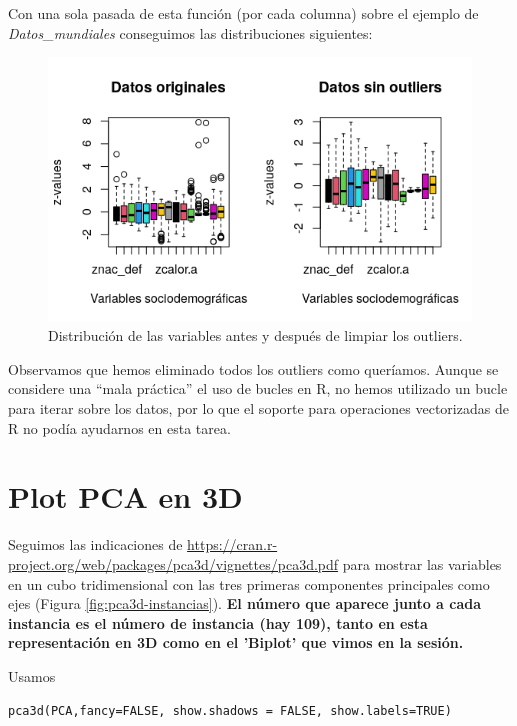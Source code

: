 \documentclass[12pt]{article}
\begin{document}
Con una sola pasada de esta función (por cada columna) sobre el
ejemplo de \textit{Datos\_mundiales} conseguimos las distribuciones siguientes:

\begin{figure}[H]
  \centering
  \includegraphics[width=140mm]{imgs/mundiales-outliers}
  \caption{Distribución de las variables antes y después de limpiar los outliers.}
\end{figure}

Observamos que hemos eliminado todos los outliers como
queríamos. Aunque se considere una ``mala práctica'' el uso de bucles
en R, no hemos utilizado un bucle para iterar sobre los datos, por lo
que el soporte para operaciones vectorizadas de R no podía ayudarnos
en esta tarea.

\section{Plot PCA en 3D}

Seguimos las indicaciones de
\href{https://cran.r-project.org/web/packages/pca3d/vignettes/pca3d.pdf}{https://cran.r-project.org/web/packages/pca3d/vignettes/pca3d.pdf}
para mostrar las variables en un cubo tridimensional con las tres
primeras componentes principales como ejes (Figura
\ref{fig:pca3d-instancias}). \textbf{El número que aparece junto a
  cada instancia es el número de instancia (hay 109), tanto en esta
  representación en 3D como en el 'Biplot' que vimos en la sesión.}

Usamos
\begin{verbatim}
pca3d(PCA,fancy=FALSE, show.shadows = FALSE, show.labels=TRUE)
\end{verbatim}
\end{document}
